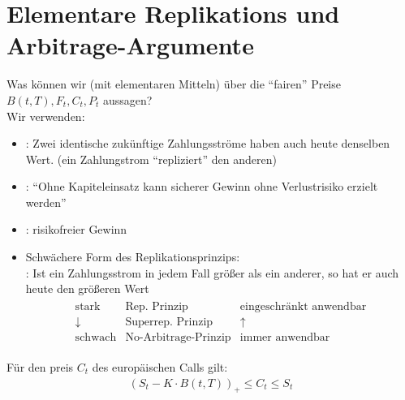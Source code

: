 \section{Elementare Replikations und Arbitrage-Argumente}
Was können wir (mit elementaren Mitteln) über die ``fairen'' Preise $B(t,T), F_t, C_t, P_t$ aussagen?\\
Wir verwenden:
\begin{itemize}
	\item {}: Zwei identische zukünftige Zahlungsströme haben auch heute denselben Wert. (ein Zahlungstrom ``repliziert'' den anderen) %
	\item {}: ``Ohne Kapiteleinsatz kann sicherer Gewinn ohne Verlustrisiko erzielt werden''
	\item {}: risikofreier Gewinn\\
	\item Schwächere Form des Replikationsprinzips:\\
	: Ist ein Zahlungsstrom in jedem Fall größer als ein anderer, so hat er auch heute den größeren Wert
	\begin{align*}
	\begin{matrix}
	\text{stark} & \text{Rep. Prinzip} & \text{eingeschränkt anwendbar}\\
	\downarrow & \text{Superrep. Prinzip} & \uparrow\\
	\text{schwach} & \text{No-Arbitrage-Prinzip} & \text{immer anwendbar}
	\end{matrix}
	\end{align*}
\end{itemize}
\begin{lemma} %
	Für den preis $C_t$ des europäischen Calls gilt:
	\begin{align*}
	(S_t - K\cdot B(t,T))_+ \le C_t \le S_t
	\end{align*}
\end{lemma}
